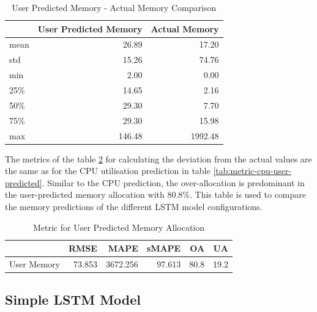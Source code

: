       \begin{table}
        \centering
        \caption{User Predicted Memory - Actual Memory Comparison}
        \label{tab:user-predicted-memory-comparison}
        \begin{tabular}{|l|rr|}
          \toprule
          {} &  User Predicted Memory &  Actual Memory \\
          \midrule
          mean       &          26.89 &    17.20 \\
          std        &          15.26 &    74.76 \\
          min        &           2.00 &     0.00 \\
          25\%        &          14.65 &     2.16 \\
          50\%        &          29.30 &     7.70 \\
          75\%        &          29.30 &    15.98 \\
          max        &         146.48 &  1992.48 \\
          \bottomrule
          \end{tabular}
      \end{table}
      The metrics of the table \ref{tab:metric-mem-user-predicted} for calculating the deviation from the actual values are the same as for the CPU utilisation prediction in table \ref{tab:metric-cpu-user-predicted}.
      Similar to the CPU prediction, the over-allocation is predominant in the user-predicted memory allocation with $80.8\%$.
      This table is used to compare the memory predictions of the different LSTM model configurations. 

      \begin{table}
        \centering
        \caption{Metric for User Predicted Memory Allocation}
        \label{tab:metric-mem-user-predicted}
        \begin{tabular}{|l|rrrrr|}
          \toprule
          {} &    RMSE &     MAPE &   sMAPE &     OA &     UA \\
          \midrule
          User Memory &  73.853 &  3672.256 &  97.613 &  80.8 &  19.2 \\
          \bottomrule
          \end{tabular}
      \end{table}

  \subsection{Simple LSTM Model}
  \label{sec:simple-lstm-model-evaluation-scenarios}
    
